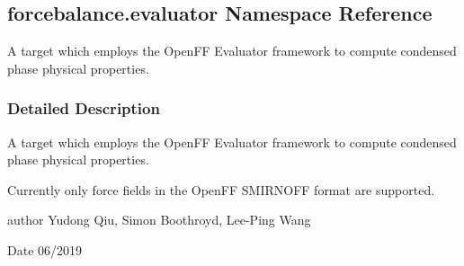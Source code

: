 \hypertarget{namespaceforcebalance_1_1evaluator}{}\subsection{forcebalance.\+evaluator Namespace Reference}
\label{namespaceforcebalance_1_1evaluator}


A target which employs the Open\+FF Evaluator framework to compute condensed phase physical properties.  




\subsubsection{Detailed Description}
A target which employs the Open\+FF Evaluator framework to compute condensed phase physical properties. 

Currently only force fields in the Open\+FF S\+M\+I\+R\+N\+O\+FF format are supported.

author Yudong Qiu, Simon Boothroyd, Lee-\/\+Ping Wang \begin{DoxyDate}{Date}
06/2019 
\end{DoxyDate}
